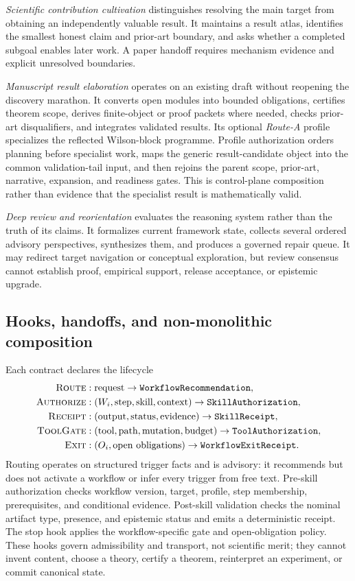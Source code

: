 \documentclass[11pt]{article}
\begin{document}
\emph{Scientific contribution cultivation} distinguishes resolving the main target from obtaining an independently valuable result. It maintains a result atlas, identifies the smallest honest claim and prior-art boundary, and asks whether a completed subgoal enables later work. A paper handoff requires mechanism evidence and explicit unresolved boundaries.

\emph{Manuscript result elaboration} operates on an existing draft without reopening the discovery marathon. It converts open modules into bounded obligations, certifies theorem scope, derives finite-object or proof packets where needed, checks prior-art disqualifiers, and integrates validated results. Its optional \emph{Route-A} profile specializes the reflected Wilson-block programme. Profile authorization orders planning before specialist work, maps the generic result-candidate object into the common validation-tail input, and then rejoins the parent scope, prior-art, narrative, expansion, and readiness gates. This is control-plane composition rather than evidence that the specialist result is mathematically valid.

\emph{Deep review and reorientation} evaluates the reasoning system rather than the truth of its claims. It formalizes current framework state, collects several ordered advisory perspectives, synthesizes them, and produces a governed repair queue. It may redirect target navigation or conceptual exploration, but review consensus cannot establish proof, empirical support, release acceptance, or epistemic upgrade.

\subsection{Hooks, handoffs, and non-monolithic composition}

Each contract declares the lifecycle
\[
\begin{aligned}
\textsc{Route} &: \text{request}\rightarrow\texttt{WorkflowRecommendation},\\
\textsc{Authorize} &: (W_i,\text{step},\text{skill},\text{context})\rightarrow\texttt{SkillAuthorization},\\
\textsc{Receipt} &: (\text{output},\text{status},\text{evidence})\rightarrow\texttt{SkillReceipt},\\
\textsc{ToolGate} &: (\text{tool},\text{path},\text{mutation},\text{budget})\rightarrow\texttt{ToolAuthorization},\\
\textsc{Exit} &: (O_i,\text{open obligations})\rightarrow\texttt{WorkflowExitReceipt}.
\end{aligned}
\]
Routing operates on structured trigger facts and is advisory: it recommends but does not activate a workflow or infer every trigger from free text. Pre-skill authorization checks workflow version, target, profile, step membership, prerequisites, and conditional evidence. Post-skill validation checks the nominal artifact type, presence, and epistemic status and emits a deterministic receipt. The stop hook applies the workflow-specific gate and open-obligation policy. These hooks govern admissibility and transport, not scientific merit; they cannot invent content, choose a theory, certify a theorem, reinterpret an experiment, or commit canonical state.
\end{document}
